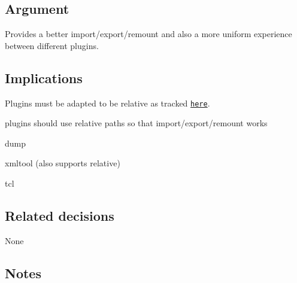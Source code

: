 \subsection*{Argument}

Provides a better import/export/remount and also a more uniform experience between different plugins.

\subsection*{Implications}

Plugins must be adapted to be relative as tracked \href{https://github.com/ElektraInitiative/libelektra/issues/51}{\tt here}.

plugins should use relative paths so that import/export/remount works


\begin{DoxyItemize}
\item dump
\item xmltool (also supports relative)
\item tcl
\end{DoxyItemize}

\subsection*{Related decisions}

None

\subsection*{Notes}